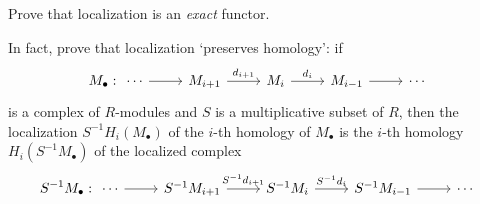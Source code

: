 \documentclass[../../master.tex]{subfiles}
\begin{document}
\begin{problem}
    Prove that localization is an \textit{exact} functor.

    In fact, prove that localization `preserves homology': if
    \[
        M_{\bullet}: 
        \begin{tikzcd}
            {\cdots} & M_{i + 1} & M_{i} & M_{i-1} & {\cdots}
            \arrow[from=1-1, to=1-2]
            \arrow["d_{i+1}", from=1-2, to=1-3]
            \arrow["d_i", from=1-3, to=1-4]
            \arrow[from=1-4, to=1-5] 
        \end{tikzcd}
    \]
    is a complex of $R$-modules and $S$ is a multiplicative subset of $R$, then the localization $S^{-1}H_i(M_{\bullet})$ of the $i$-th homology of $M_{\bullet}$ is the $i$-th homology $H_i(S^{-1}M_{\bullet})$ of the localized complex
    \[
        S^{-1}M_{\bullet}:
        \begin{tikzcd}
            {\cdots} & S^{-1}M_{i+1} & S^{-1}M_i & S^{-1}M_{i-1} & {\cdots}
            \arrow[from=1-1, to=1-2]
            \arrow["S^{-1}d_{i+1}", from=1-2, to=1-3]
            \arrow["S^{-1}d_i", from=1-3, to=1-4]
            \arrow[from=1-4, to=1-5] 
        \end{tikzcd}
    \]
\end{problem}
\end{document}

